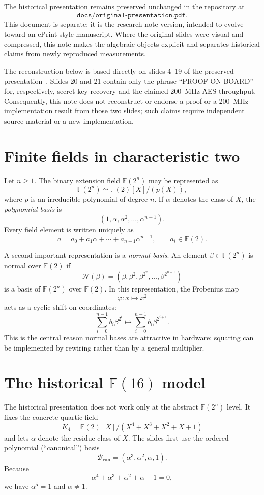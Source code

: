 \documentclass[11pt]{article}
\newcommand{\GF}{\mathbb{F}}
\begin{document}
The historical presentation remains preserved unchanged in the repository at
\[
  \texttt{docs/original-presentation.pdf}.
\]
This document is separate: it is the research-note version, intended to evolve
toward an ePrint-style manuscript.
Where the original slides were visual and compressed, this note makes the
algebraic objects explicit and separates historical claims from newly
reproduced measurements.

The reconstruction below is based directly on slides 4--19 of the preserved
presentation~\cite{historical}.  Slides 20 and 21 contain only the phrase ``PROOF ON BOARD'' for,
respectively, secret-key recovery and the claimed 200~MHz AES throughput.
Consequently, this note does not reconstruct or endorse a proof or a
200~MHz implementation result from those two slides; such claims require
independent source material or a new implementation.

\section{Finite fields in characteristic two}

Let $n\geq 1$.  The binary extension field $\GF(2^n)$ may be represented as
\[
  \GF(2^n) \simeq \GF(2)[X]/(p(X)),
\]
where $p$ is an irreducible polynomial of degree $n$.  If $\alpha$ denotes the
class of $X$, the \emph{polynomial basis} is
\[
  (1,\alpha,\alpha^2,\ldots,\alpha^{n-1}).
\]
Every field element is written uniquely as
\[
  a = a_0 + a_1\alpha + \cdots + a_{n-1}\alpha^{n-1},
  \qquad a_i\in\GF(2).
\]

A second important representation is a \emph{normal basis}.  An element
$\beta\in\GF(2^n)$ is normal over $\GF(2)$ if
\[
  \mathcal N(\beta)=
  (\beta,\beta^2,\beta^{2^2},\ldots,\beta^{2^{n-1}})
\]
is a basis of $\GF(2^n)$ over $\GF(2)$.  In this representation, the Frobenius
map
\[
  \varphi : x \longmapsto x^2
\]
acts as a cyclic shift on coordinates:
\[
  \sum_{i=0}^{n-1} b_i \beta^{2^i}
  \longmapsto
  \sum_{i=0}^{n-1} b_i \beta^{2^{i+1}}.
\]
This is the central reason normal bases are attractive in hardware:
squaring can be implemented by rewiring rather than by a general multiplier.


\section{The historical \texorpdfstring{$\GF(16)$}{GF(16)} model}

The historical presentation does not work only at the abstract
$\GF(2^n)$ level.  It fixes the concrete quartic field
\[
  K_4
  =
  \GF(2)[X]/(X^4+X^3+X^2+X+1)
\]
and lets $\alpha$ denote the residue class of $X$.  The slides first use the
ordered polynomial (``canonical'') basis
\[
  \mathcal B_{\mathrm{can}}
  =
  (\alpha^3,\alpha^2,\alpha,1).
\]
Because
\[
  \alpha^4+\alpha^3+\alpha^2+\alpha+1=0,
\]
we have $\alpha^5=1$ and $\alpha\neq 1$.
\end{document}

